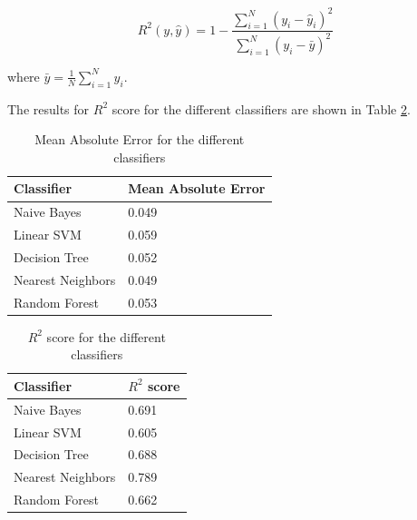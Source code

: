 \documentclass[conference]{IEEEtran}
\begin{document}
\begin{equation}\label{eqn9}
    R^2(y, \hat{y}) = 1 - \frac{\sum_{i=1}^{N} (y_{i} - \hat{y}_{i})^{2}}{\sum_{i=1}^N (y_{i} - \bar{y})^{2}}
\end{equation}

\noindent where $\bar{y} =  \frac{1}{N} \sum_{i=1}^{N} y_{i}$.

\noindent The results for $R^{2}$ score for the different classifiers are shown in Table \ref{tbl:r2}.
\begin{table}[t!]
\renewcommand{\arraystretch}{1.3}
\caption{Mean Absolute Error for the different classifiers }\label{tbl:mae}
\centering

    \begin{tabular}{|l|l|}
    \hline
      Classifier & Mean Absolute Error  \\   \hline
      Naive Bayes & 0.049    \\ \hline
      Linear SVM & 0.059  \\    \hline
      Decision Tree &  0.052  \\   \hline
      Nearest Neighbors & 0.049   \\    \hline
      Random Forest & 0.053   \\    \hline
    \end{tabular}

\end{table}

\begin{table}[Htbp]
\renewcommand{\arraystretch}{1.3}
\caption{$R^{2}$ score for the different classifiers }\label{tbl:r2}
\centering
    \begin{tabular}{|l|l|}
    \hline
      Classifier & $R^{2}$ score   \\ \hline
      Naive Bayes &   0.691  \\
      \hline
      Linear SVM &  0.605 \\
      \hline
      Decision Tree & 0.688   \\
      \hline
      Nearest Neighbors &  0.789  \\
      \hline
      Random Forest & 0.662   \\    \hline
    \end{tabular}

\end{table}
\end{document}
